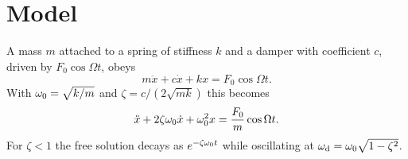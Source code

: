 \section{Model}\label{sec:model}
A mass $m$ attached to a spring of stiffness $k$ and a damper with coefficient $c$, driven by
$F_0\cos\Omega t$, obeys
\begin{equation}\label{eq:motion}
  m\ddot x + c\dot x + kx = F_0\cos\Omega t .
\end{equation}
With $\omega_0 = \sqrt{k/m}$ and $\zeta = c/(2\sqrt{mk})$ this becomes
\begin{equation}\label{eq:normal}
  \ddot x + 2\zeta\omega_0\dot x + \omega_0^2 x = \frac{F_0}{m}\cos\Omega t .
\end{equation}
For $\zeta<1$ the free solution decays as $e^{-\zeta\omega_0 t}$ while oscillating at
$\omega_\mathrm{d} = \omega_0\sqrt{1-\zeta^2}$.
